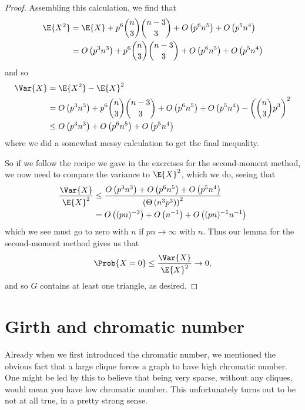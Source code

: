 \documentclass[nobib]{tufte-handout}
\begin{document}
\begin{proposition}
\begin{proof}
    Assembling this calculation, we find that
    \begin{align*}
      \E{X^2} &= \E{X} + p^6\binom{n}{3}\binom{n-3}{3} + O\left(p^6 n^5\right) + O\left(p^5 n^4\right)\\
      &= O\left(p^3 n^3\right) + p^6\binom{n}{3}\binom{n-3}{3} + O\left(p^6 n^5\right) + O\left(p^5 n^4\right)
    \end{align*}
    and so
    \begin{align*}
      \Var{X} &= \E{X^2} - \E{X}^2\\
      &= O\left(p^3 n^3\right) + p^6\binom{n}{3}\binom{n-3}{3} + O\left(p^6 n^5\right) + O\left(p^5 n^4\right) - \left(\binom{n}{3} p^3\right)^2\\
      &\leq O\left(p^3 n^3\right) + O\left(p^6 n^5\right) + O\left(p^5 n^4\right)
    \end{align*}
    where we did a somewhat messy calculation to get the final inequality.

    So if we follow the recipe we gave in the exercises for the second-moment method, we now need to compare the variance to $\E{X}^2$, which we do, seeing that
    \begin{align*}
      \frac{\Var{X}}{\E{X}^2} &\leq \frac{O\left(p^3 n^3\right) + O\left(p^6 n^5\right) + O\left(p^5 n^4\right)}{\left(\Theta\left(n^3 p^3\right)\right)^2}\\
      &= O\left((pn)^{-3}\right) + O\left(n^{-1}\right) + O\left((pn)^{-1}n^{-1}\right)
    \end{align*}
    which we see must go to zero with $n$ if $pn \to \infty$ with $n$. Thus our lemma for the second-moment method gives us that
    $$\Prob{X = 0} \leq \frac{\Var{X}}{\E{X}^2} \to 0,$$
    and so $G$ contains at least one triangle, as desired.
  \end{proof}
\end{proposition}

\section{Girth and chromatic number}

Already when we first introduced the chromatic number, we mentioned the obvious fact that a large clique forces a graph to have high chromatic number. One might be led by this to believe that being very sparse, without any cliques, would mean you have low chromatic number. This unfortunately turns out to be not at all true, in a pretty strong sense.
\end{document}
